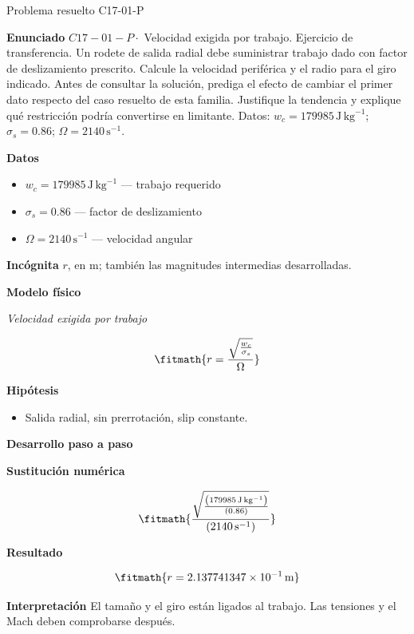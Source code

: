 \documentclass[10pt,openany]{book}
\begin{document}
\begin{studiumworked}{Problema resuelto C17-01-P}


\noindent\textbf{Enunciado}
\(C17-01-P \cdot\) Velocidad exigida por trabajo. Ejercicio de transferencia. Un rodete de salida radial debe suministrar trabajo dado con factor de deslizamiento prescrito. Calcule la velocidad periférica y el radio para el giro indicado. Antes de consultar la solución, prediga el efecto de cambiar el primer dato respecto del caso resuelto de esta familia. Justifique la tendencia y explique qué restricción podría convertirse en limitante. Datos: \(w_c=179985\, \mathrm{J}\,\mathrm{kg}^{-1}\); \(\sigma_s=0.86\); \(\Omega=2140\, \mathrm{s}^{-1}\).

\noindent\textbf{Datos}
\begin{itemize}
\item $w_c = 179985\,\mathrm{J}\,\mathrm{kg}^{-1}$ — trabajo requerido
\item $\sigma_s = 0.86$ — factor de deslizamiento
\item $\Omega = 2140\,\mathrm{s}^{-1}$ — velocidad angular
\end{itemize}

\noindent\textbf{Incógnita}
$r$, en $\mathrm{m}$; también las magnitudes intermedias desarrolladas.

\noindent\textbf{Modelo físico}

\noindent\textit{Velocidad exigida por trabajo}

\[
\fitmath{r=\frac{\sqrt{\frac{w_c}{\sigma_s}}}{\Omega}}
\]

\noindent\textbf{Hipótesis}
\begin{itemize}
\item Salida radial, sin prerrotación, slip constante.
\end{itemize}

\noindent\textbf{Desarrollo paso a paso}



\noindent\textbf{Sustitución numérica}

\[
\fitmath{\frac{\sqrt{\frac{\left(179985\,\mathrm{J}\,\mathrm{kg}^{-1}\right)}{\left(0.86\right)}}}{\left(2140\,\mathrm{s}^{-1}\right)}}
\]

\noindent\textbf{Resultado}

\[
\fitmath{r=2.137741347\times10^{-1}\,\mathrm{m}}
\]

\noindent\textbf{Interpretación}
El tamaño y el giro están ligados al trabajo. Las tensiones y el Mach deben comprobarse después.


\end{studiumworked}
\end{document}
